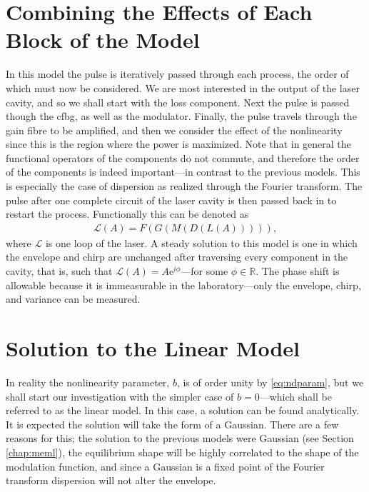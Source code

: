 \section{Combining the Effects of Each Block of the Model}
\label{sec:effects}
In this model the pulse is iteratively passed through each process, the order of which must now be considered. We are most interested in the output of the laser cavity, and so we shall start with the loss component. Next the pulse is passed though the \gls{cfbg}, as well as the modulator. Finally, the pulse travels through the gain fibre to be amplified, and then we consider the effect of the nonlinearity since this is the region where the power is maximized. Note that in general the functional operators of the components do not commute, and therefore the order of the components is indeed important---in contrast to the previous models. This is especially the case of dispersion as realized through the Fourier transform. The pulse after one complete circuit of the laser cavity is then passed back in to restart the process. Functionally this can be denoted as
\begin{align}
	\mathcal{L}(A) = F(G(M(D(L(A))))),
\end{align}
where $\mathcal{L}$ is one loop of the laser. A steady solution to this model is one in which the envelope and chirp are unchanged after traversing every component in the cavity, that is, such that $\mathcal{L}(A) = A \textrm{e}^{i \phi}$---for some $\phi \in \mathbb{R}$. The phase shift is allowable because it is immeasurable in the laboratory---only the envelope, chirp, and variance can be measured.

\section{Solution to the Linear Model}
\label{sec:linear}
In reality the nonlinearity parameter, $b$, is of order unity by \eqref{eq:ndparam}, but we shall start our investigation with the simpler case of $b = 0$---which shall be referred to as the linear model. In this case, a solution can be found analytically. It is expected the solution will take the form of a Gaussian. There are a few reasons for this; the solution to the previous models were Gaussian \cite{cutler, siegman, kuizenga1970a, martinez1984, martinez1985} (see Section \ref{chap:meml}), the equilibrium shape will be highly correlated to the shape of the modulation function, and since a Gaussian is a fixed point of the Fourier transform \cite{gradshteyn} dispersion will not alter the envelope. \\

